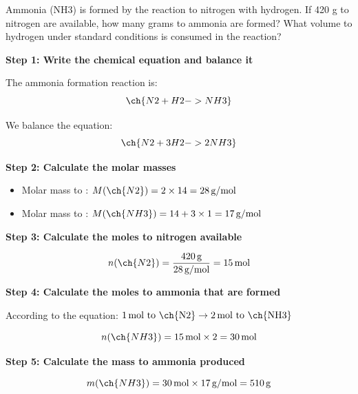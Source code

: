 \begin{exercise}
    Ammonia (NH3) is formed by the reaction to nitrogen with hydrogen.
    If
    420 g to nitrogen are available, how many grams to ammonia are formed? What volume to
    hydrogen under standard conditions is consumed in the reaction?
    \begin{solu}
        \textbf{Step 1: Write the chemical equation and balance it}

        The ammonia formation reaction is:
        \begin{equation*}
            \ch{N2 + H2 -> NH3}
        \end{equation*}

        We balance the equation:
        \begin{equation*}
            \ch{N2 + 3 H2 -> 2 NH3}
        \end{equation*}

        \textbf{Step 2: Calculate the molar masses}

        \begin{itemize}
            \item Molar mass to : $M(\ch{N2}) = 2 \times 14 = 28\,\text{g/mol}$
            \item Molar mass to : $M(\ch{NH3}) = 14 + 3 \times 1 = 17\,\text{g/mol}$
        \end{itemize}

        \textbf{Step 3: Calculate the moles to nitrogen available}

        \begin{equation*}
            n(\ch{N2}) = \frac{420\,\text{g}}{28\,\text{g/mol}} = 15\,\text{mol}
        \end{equation*}

        \textbf{Step 4: Calculate the moles to ammonia that are formed}

        According to the equation: $1\,\text{mol to \ch{N2}} \rightarrow 2\,\text{mol to \ch{NH3}}$

        \begin{equation*}
            n(\ch{NH3}) = 15\,\text{mol} \times 2 = 30\,\text{mol}
        \end{equation*}

        \textbf{Step 5: Calculate the mass to ammonia produced}

        \begin{equation*}
            m(\ch{NH3}) = 30\,\text{mol} \times 17\,\text{g/mol} = 510\,\text{g}
        \end{equation*}


\end{solu}
\end{exercise}
